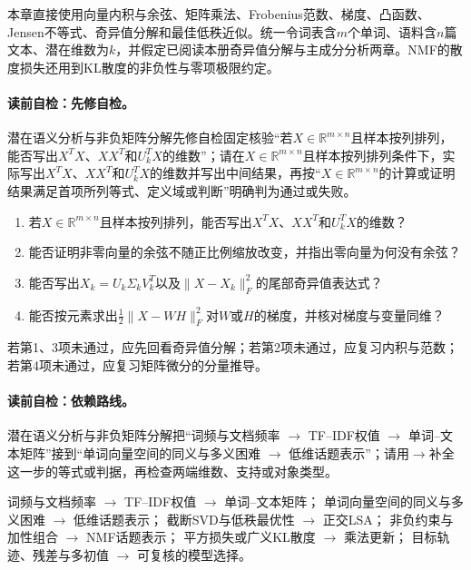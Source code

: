 \begin{prerequisitebox}
本章直接使用向量内积与余弦、矩阵乘法、Frobenius范数、梯度、凸函数、Jensen不等式、奇异值分解和最佳低秩近似。统一令词表含$m$个单词、语料含$n$篇文本、潜在维数为$k$，并假定已阅读本册奇异值分解与主成分分析两章。NMF的散度损失还用到KL散度的非负性与零项极限约定。
\end{prerequisitebox}

\label{struct:V4-C05-CH03}
\paragraph{读前自检：先修自检。}潜在语义分析与非负矩阵分解先修自检固定核验“若$X\in\mathbb R^{m\times n}$且样本按列排列，能否写出$X^TX$、$XX^T$和$U_k^TX$的维数”；请在$X\in\mathbb R^{m\times n}$且样本按列排列条件下，实际写出$X^TX$、$XX^T$和$U_k^TX$的维数并写出中间结果，再按“$X\in\mathbb R^{m\times n}$的计算或证明结果满足首项所列等式、定义域或判断”明确判为通过或失败。\par

\begin{precheckbox}
\begin{enumerate}[leftmargin=2.2em]
  \item 若$X\in\mathbb R^{m\times n}$且样本按列排列，能否写出$X^TX$、$XX^T$和$U_k^TX$的维数？
  \item 能否证明非零向量的余弦不随正比例缩放改变，并指出零向量为何没有余弦？
  \item 能否写出$X_k=U_k\Sigma_kV_k^T$以及$\|X-X_k\|_F^2$的尾部奇异值表达式？
  \item 能否按元素求出$\frac12\|X-WH\|_F^2$对$W$或$H$的梯度，并核对梯度与变量同维？
\end{enumerate}
若第1、3项未通过，应先回看奇异值分解；若第2项未通过，应复习内积与范数；若第4项未通过，应复习矩阵微分的分量推导。
\end{precheckbox}

\label{struct:V4-C05-CH04}
\paragraph{读前自检：依赖路线。}潜在语义分析与非负矩阵分解把“词频与文档频率 $\to$ TF--IDF权值 $\to$ 单词--文本矩阵”接到“单词向量空间的同义与多义困难 $\to$ 低维话题表示”；请用$\to$补全这一步的等式或判据，再检查两端维数、支持或对象类型。\par

\begin{dependencybox}
词频与文档频率 $\to$ TF--IDF权值 $\to$ 单词--文本矩阵；
单词向量空间的同义与多义困难 $\to$ 低维话题表示；
截断SVD与低秩最优性 $\to$ 正交LSA；
非负约束与加性组合 $\to$ NMF话题表示；
平方损失或广义KL散度 $\to$ 乘法更新；
目标轨迹、残差与多初值 $\to$ 可复核的模型选择。
\end{dependencybox}

